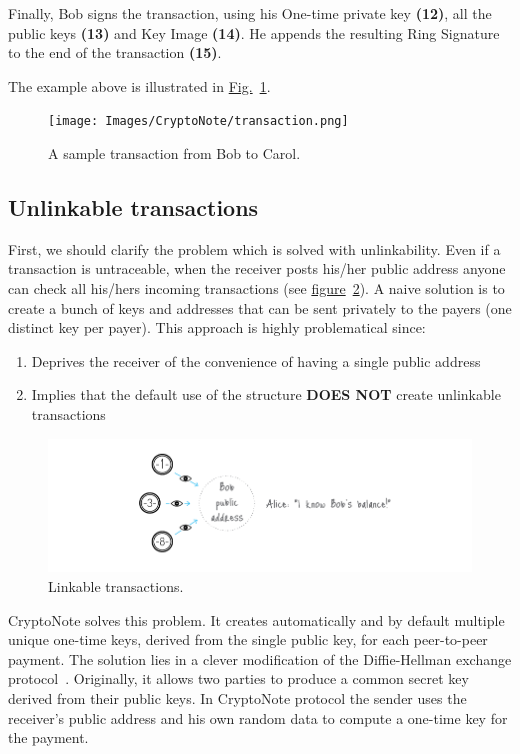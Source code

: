 Finally, Bob signs the transaction, using his One-time private key \textbf{(12)}, all the public keys \textbf{(13)} and Key Image \textbf{(14)}. He appends the resulting Ring Signature to the end of the transaction \textbf{(15)}.

The example above is illustrated in \hyperref[fig:transaction]{Fig.}~\ref{fig:transaction}.\\
\begin{figure}[ht]
  \centering
  \texttt{[image: Images/CryptoNote/transaction.png]}
  \caption{A sample transaction from Bob to Carol.}
  \label{fig:transaction}
\end{figure}
%
\subsection{Unlinkable transactions}
First, we should clarify the problem which is solved with unlinkability. Even if a transaction is untraceable, when the receiver posts his/her public address anyone can check all his/hers incoming transactions (see \hyperref[fig:linkable]{figure}~\ref{fig:linkable}). A naive solution is to create a bunch of keys and addresses that can be sent privately to the payers (one distinct key per payer). This approach is highly problematical since:
\begin{enumerate}[label=\alph*)]
  \item Deprives the receiver of the convenience of having a single public address
  \item Implies that the default use of the structure \textbf{DOES NOT} create unlinkable transactions
\end{enumerate}

\begin{figure}[H]
  \centering
  \includegraphics[width=0.9 \columnwidth,keepaspectratio]{Images/CryptoNote/linkable.png}
  \caption{Linkable transactions.~\cite{cryptonote}}
  \label{fig:linkable}
\end{figure}

CryptoNote solves this problem. It creates automatically and by default multiple unique one-time keys, derived from the single public key, for each peer-to-peer payment. The solution lies in a clever modification of the Diffie-Hellman exchange protocol~\cite{Diffie:2006:NDC:2263321.2269104}. Originally, it allows two parties to produce a common secret key derived from their public keys. In CryptoNote protocol the sender uses the receiver's public address and his own random data to compute a one-time key for the payment.

